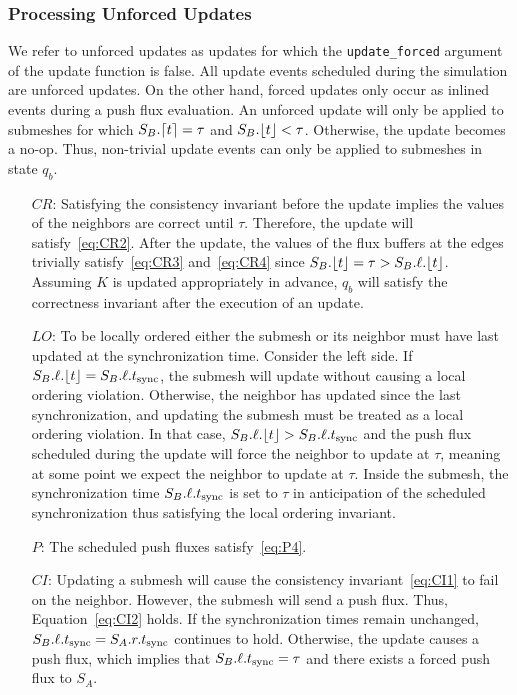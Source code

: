 \subsubsection{Processing Unforced Updates}
We refer to unforced updates as updates for which the \lstinline{update_forced} argument of the update function is false. All update events scheduled during the simulation are unforced updates. On the other hand, forced updates only occur as inlined events during a push flux evaluation. An unforced update will only be applied to submeshes for which $S_B.\lceil t \rceil = \tau$ and $S_B.\lfloor t \rfloor < \tau$. Otherwise, the update becomes a no-op. Thus, non-trivial update events can only be applied to submeshes in state $q_b$. %
\begin{enumerate}
    \item[$CR$:] Satisfying the consistency invariant before the update implies the values of the neighbors are correct until $\tau$. Therefore, the update will satisfy~\eqref{eq:CR2}. After the update, the values of the flux buffers at the edges trivially satisfy~\eqref{eq:CR3} and~\eqref{eq:CR4} since $S_B.\lfloor t \rfloor = \tau > S_B.\ell.\lfloor t \rfloor$. Assuming $K$ is updated appropriately in {\sc advance}, $q_b$ will satisfy the correctness invariant after the execution of an update.
    \item[$LO$:] To be locally ordered either the submesh or its neighbor must have last updated at the synchronization time. Consider the left side. If $S_B.\ell.\lfloor t \rfloor = S_B.\ell.t_{\text{sync}}$, the submesh will update without causing a local ordering violation. Otherwise, the neighbor has updated since the last synchronization, and updating the submesh must be treated as a local ordering violation. In that case, $S_B.\ell.\lfloor t \rfloor > S_B.\ell.t_{\text{sync}}$ and the push flux scheduled during the update will force the neighbor to update at $\tau$, meaning at some point we expect the neighbor to update at $\tau$.  Inside the submesh, the synchronization time $S_B.\ell.t_{\text{sync}}$ is set to $\tau$ in anticipation of the scheduled synchronization thus satisfying the local ordering invariant.
    \item[$P$:] The scheduled push fluxes satisfy~\eqref{eq:P4}.
    \item[$CI$:] Updating a submesh will cause the consistency invariant~\eqref{eq:CI1} to fail on the neighbor. However, the submesh will send a push flux. Thus, Equation~\eqref{eq:CI2} holds. If the synchronization times remain unchanged, $S_B.\ell.t_{\text{sync}}=S_A.r.t_{\text{sync}}$ continues to hold. Otherwise, the update causes a push flux, which implies that $S_B.\ell.t_{\text{sync}}=\tau$ and there exists a forced push flux to $S_A$.
\end{enumerate}
